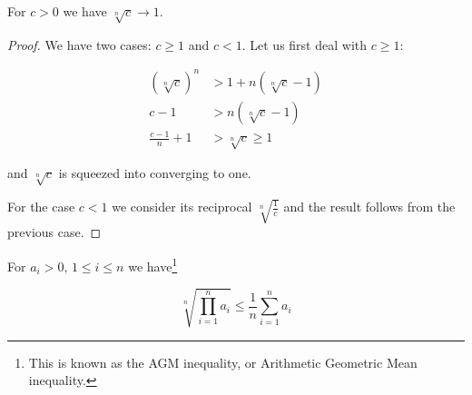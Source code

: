 \begin{thm}
For $c > 0$ we have $\sqrt[n]{c} \rightarrow 1$.
\end{thm}

\begin{proof}
We have two cases: $c \geq 1$ and $c < 1$. Let us first deal with $c \geq 1$:

\begin{align*}
(\sqrt[n]{c})^n &> 1 + n (\sqrt[n]{c} - 1) \\
            c - 1  &> n (\sqrt[n]{c} - 1) \\
           \frac{c-1}{n} + 1 &> \sqrt[n]{c} \geq 1
\end{align*}

and $\sqrt[n]{c}$ is squeezed into converging to one.

For the case $c < 1$ we consider its reciprocal $\sqrt[n]{\frac{1}{c}}$ and the result follows from the previous case.
\end{proof}

\begin{thm}
For $a_i > 0 \text{, } 1 \leq i \leq n$ we have\footnote{This is known as the AGM inequality, or Arithmetic Geometric Mean inequality.}

$$
\sqrt[n]{\prod_{i = 1}^n a_i} \leq \frac{1}{n} \sum_{i = 1}^n a_i
$$

\end{thm}

